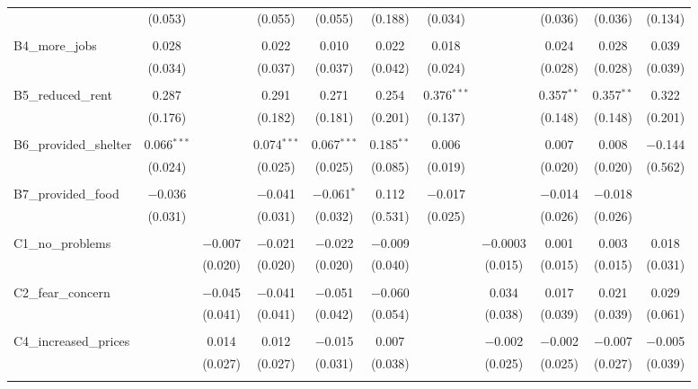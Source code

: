 \begin{table}[H]
\begin{tabular}{@{\extracolsep{4pt}}lcccccccccc}
  & (0.053) &  & (0.055) & (0.055) & (0.188) & (0.034) &  & (0.036) & (0.036) & (0.134) \\ 
  & & & & & & & & & & \\ 
 B4\_more\_jobs & 0.028 &  & 0.022 & 0.010 & 0.022 & 0.018 &  & 0.024 & 0.028 & 0.039 \\ 
  & (0.034) &  & (0.037) & (0.037) & (0.042) & (0.024) &  & (0.028) & (0.028) & (0.039) \\ 
  & & & & & & & & & & \\ 
 B5\_reduced\_rent & 0.287 &  & 0.291 & 0.271 & 0.254 & 0.376$^{***}$ &  & 0.357$^{**}$ & 0.357$^{**}$ & 0.322 \\ 
  & (0.176) &  & (0.182) & (0.181) & (0.201) & (0.137) &  & (0.148) & (0.148) & (0.201) \\ 
  & & & & & & & & & & \\ 
 B6\_provided\_shelter & 0.066$^{***}$ &  & 0.074$^{***}$ & 0.067$^{***}$ & 0.185$^{**}$ & 0.006 &  & 0.007 & 0.008 & $-$0.144 \\ 
  & (0.024) &  & (0.025) & (0.025) & (0.085) & (0.019) &  & (0.020) & (0.020) & (0.562) \\ 
  & & & & & & & & & & \\ 
 B7\_provided\_food & $-$0.036 &  & $-$0.041 & $-$0.061$^{*}$ & 0.112 & $-$0.017 &  & $-$0.014 & $-$0.018 &  \\ 
  & (0.031) &  & (0.031) & (0.032) & (0.531) & (0.025) &  & (0.026) & (0.026) &  \\ 
  & & & & & & & & & & \\ 
 C1\_no\_problems &  & $-$0.007 & $-$0.021 & $-$0.022 & $-$0.009 &  & $-$0.0003 & 0.001 & 0.003 & 0.018 \\ 
  &  & (0.020) & (0.020) & (0.020) & (0.040) &  & (0.015) & (0.015) & (0.015) & (0.031) \\ 
  & & & & & & & & & & \\ 
 C2\_fear\_concern &  & $-$0.045 & $-$0.041 & $-$0.051 & $-$0.060 &  & 0.034 & 0.017 & 0.021 & 0.029 \\ 
  &  & (0.041) & (0.041) & (0.042) & (0.054) &  & (0.038) & (0.039) & (0.039) & (0.061) \\ 
  & & & & & & & & & & \\ 
 C4\_increased\_prices &  & 0.014 & 0.012 & $-$0.015 & 0.007 &  & $-$0.002 & $-$0.002 & $-$0.007 & $-$0.005 \\ 
  &  & (0.027) & (0.027) & (0.031) & (0.038) &  & (0.025) & (0.025) & (0.027) & (0.039) \\ 
  & & & & & & & & & & \\ 

\end{tabular}
\end{table}
